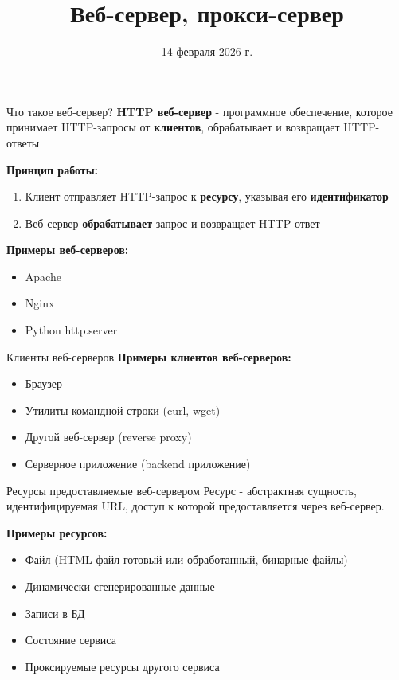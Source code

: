 \documentclass[aspectratio=169]{beamer}
\title{Веб-сервер, прокси-сервер}
\date{14 февраля 2026 г.}
\begin{document}
    \maketitle

    \begin{frame}{Что такое веб-сервер?}
        \textbf{HTTP веб-сервер} - программное обеспечение, которое принимает HTTP-запросы от \textbf{клиентов}, обрабатывает и возвращает HTTP-ответы
        
        \vspace{0.5cm}
        
        \textbf{Принцип работы:}
        \begin{enumerate}
            \item Клиент отправляет HTTP-запрос к \textbf{ресурсу}, указывая его \textbf{идентификатор}
            \item Веб-сервер \textbf{обрабатывает} запрос и возвращает HTTP ответ
        \end{enumerate}
        
        \vspace{0.5cm}
        
        \textbf{Примеры веб-серверов:}
        \begin{itemize}
            \item Apache
            \item Nginx
            \item Python http.server
        \end{itemize}
    \end{frame}

    \begin{frame}{Клиенты веб-серверов}
        \textbf{Примеры клиентов веб-серверов:}
        \begin{itemize}
            \item Браузер
            \item Утилиты командной строки (curl, wget)
            \item Другой веб-сервер (reverse proxy)
            \item Серверное приложение (backend приложение)
        \end{itemize}
    \end{frame}

    \begin{frame}{Ресурсы предоставляемые веб-сервером}
        Ресурс - абстрактная сущность, идентифицируемая URL, доступ к которой предоставляется через веб-сервер.

        \textbf{Примеры ресурсов:}
        \begin{itemize}
            \item Файл (HTML файл готовый или обработанный, бинарные файлы)
            \item Динамически сгенерированные данные
            \item Записи в БД
            \item Состояние сервиса
            \item Проксируемые ресурсы другого сервиса
        \end{itemize}
    \end{frame}
\end{document}
